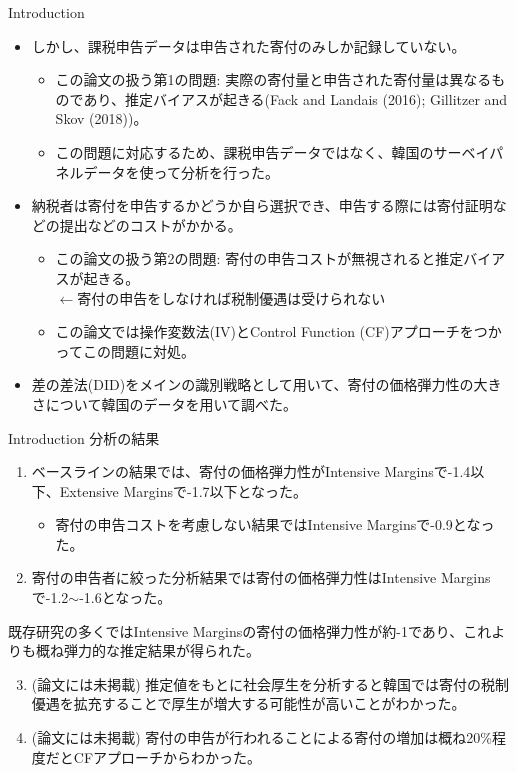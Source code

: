 \documentclass[dvipdfmx,10pt]{beamer}
\begin{document}
	\begin{frame}{Introduction}
		\protect\hypertarget{introduction-1}{}
		\begin{itemize}
			\item しかし、課税申告データは申告された寄付のみしか記録していない。
			\begin{itemize}
				\item この論文の扱う第1の問題: 実際の寄付量と申告された寄付量は異なるものであり、推定バイアスが起きる(Fack and Landais (2016); Gillitzer and Skov (2018))。
				\item この問題に対応するため、課税申告データではなく、韓国のサーベイパネルデータを使って分析を行った。
			\end{itemize}
			\item 納税者は寄付を申告するかどうか自ら選択でき、申告する際には寄付証明などの提出などのコストがかかる。			
			\begin{itemize}
				\item この論文の扱う第2の問題: 寄付の申告コストが無視されると推定バイアスが起きる。\\
				$\leftarrow$寄付の申告をしなければ税制優遇は受けられない
				\item この論文では操作変数法(IV)とControl Function (CF)アプローチをつかってこの問題に対処。
			\end{itemize}
			\item 差の差法(DID)をメインの識別戦略として用いて、寄付の価格弾力性の大きさについて韓国のデータを用いて調べた。
		\end{itemize}
	\end{frame}
	
	\begin{frame}{Introduction}
		\protect\hypertarget{introduction-2}{}
		分析の結果
		\begin{enumerate}
			\item ベースラインの結果では、寄付の価格弾力性がIntensive Marginsで-1.4以下、Extensive Marginsで-1.7以下となった。
			\begin{itemize}
				\item 寄付の申告コストを考慮しない結果ではIntensive Marginsで-0.9となった。
			\end{itemize}
			\item 寄付の申告者に絞った分析結果では寄付の価格弾力性はIntensive Marginsで-1.2\(\sim\)-1.6となった。
		\end{enumerate}
		既存研究の多くではIntensive Marginsの寄付の価格弾力性が約-1であり、これよりも概ね弾力的な推定結果が得られた。
		\begin{enumerate}
			\setcounter{enumi}{2}
			\item (論文には未掲載) 推定値をもとに社会厚生を分析すると韓国では寄付の税制優遇を拡充することで厚生が増大する可能性が高いことがわかった。
			\item (論文には未掲載) 寄付の申告が行われることによる寄付の増加は概ね20\%程度だとCFアプローチからわかった。
		\end{enumerate}
	\end{frame}
	
\end{document}
